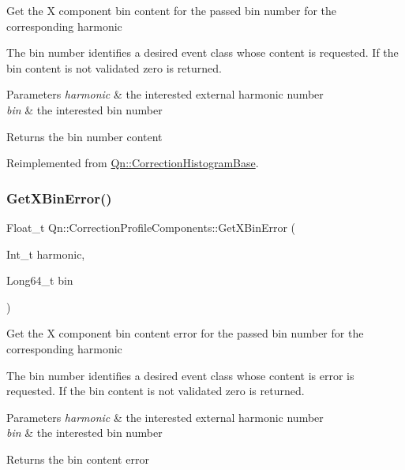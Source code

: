 Get the X component bin content for the passed bin number for the corresponding harmonic

The bin number identifies a desired event class whose content is requested. If the bin content is not validated zero is returned.


\begin{DoxyParams}{Parameters}
{\em harmonic} & the interested external harmonic number \\
\hline
{\em bin} & the interested bin number \\
\hline
\end{DoxyParams}
\begin{DoxyReturn}{Returns}
the bin number content 
\end{DoxyReturn}


Reimplemented from \mbox{\hyperlink{classQn_1_1CorrectionHistogramBase_a3dc485a3ac0767a04691a228b3189b95}{Qn\+::\+Correction\+Histogram\+Base}}.

\mbox{\label{classQn_1_1CorrectionProfileComponents_ae531786bf5f3e39e7b0eb8b02ed2405f}} 
\subsubsection{\texorpdfstring{Get\+X\+Bin\+Error()}{GetXBinError()}}
{\footnotesize\ttfamily Float\+\_\+t Qn\+::\+Correction\+Profile\+Components\+::\+Get\+X\+Bin\+Error (\begin{DoxyParamCaption}\item[{Int\+\_\+t}]{harmonic,  }\item[{Long64\+\_\+t}]{bin }\end{DoxyParamCaption})\hspace{0.3cm}{\ttfamily [virtual]}}

Get the X component bin content error for the passed bin number for the corresponding harmonic

The bin number identifies a desired event class whose content is error is requested. If the bin content is not validated zero is returned.


\begin{DoxyParams}{Parameters}
{\em harmonic} & the interested external harmonic number \\
\hline
{\em bin} & the interested bin number \\
\hline
\end{DoxyParams}
\begin{DoxyReturn}{Returns}
the bin content error 
\end{DoxyReturn}


